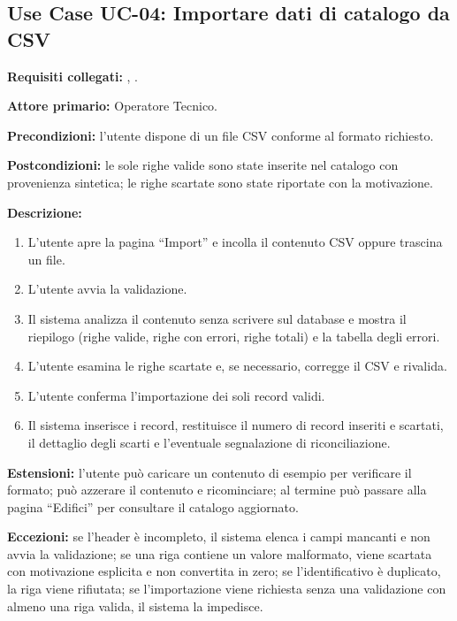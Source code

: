 \subsection*{Use Case UC-04: Importare dati di catalogo da CSV}
\textbf{Requisiti collegati:} , .\par
\textbf{Attore primario:} Operatore Tecnico.\par
\textbf{Precondizioni:} l'utente dispone di un file CSV conforme al formato richiesto.\par
\textbf{Postcondizioni:} le sole righe valide sono state inserite nel catalogo con provenienza sintetica; le righe scartate sono state riportate con la motivazione.\par
\textbf{Descrizione:}
\begin{enumerate}[leftmargin=1.6em, itemsep=0.1em]
    \item L'utente apre la pagina ``Import'' e incolla il contenuto CSV oppure trascina un file.
    \item L'utente avvia la validazione.
    \item Il sistema analizza il contenuto senza scrivere sul database e mostra il riepilogo (righe valide, righe con errori, righe totali) e la tabella degli errori.
    \item L'utente esamina le righe scartate e, se necessario, corregge il CSV e rivalida.
    \item L'utente conferma l'importazione dei soli record validi.
    \item Il sistema inserisce i record, restituisce il numero di record inseriti e scartati, il dettaglio degli scarti e l'eventuale segnalazione di riconciliazione.
\end{enumerate}
\textbf{Estensioni:} l'utente può caricare un contenuto di esempio per verificare il formato; può azzerare il contenuto e ricominciare; al termine può passare alla pagina ``Edifici'' per consultare il catalogo aggiornato.\par
\textbf{Eccezioni:} se l'header è incompleto, il sistema elenca i campi mancanti e non avvia la validazione; se una riga contiene un valore malformato, viene scartata con motivazione esplicita e non convertita in zero; se l'identificativo è duplicato, la riga viene rifiutata; se l'importazione viene richiesta senza una validazione con almeno una riga valida, il sistema la impedisce.

